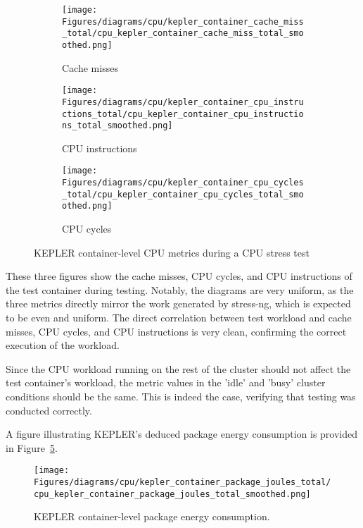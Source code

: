 \begin{figure}[H]
    \centering
    \begin{subfigure}{0.49\textwidth}
        \texttt{[image: Figures/diagrams/cpu/kepler\_container\_cache\_miss\_total/cpu\_kepler\_container\_cache\_miss\_total\_smoothed.png]}
        \caption{Cache misses}
        \label{fig:cpu_kepler_container_cache_miss_total}
    \end{subfigure}
    \begin{subfigure}{0.49\textwidth}
        \texttt{[image: Figures/diagrams/cpu/kepler\_container\_cpu\_instructions\_total/cpu\_kepler\_container\_cpu\_instructions\_total\_smoothed.png]}
        \caption{CPU instructions}
        \label{fig:cpu_kepler_container_cpu_instructions_total}
    \end{subfigure}
    \begin{subfigure}{1\textwidth}
        \texttt{[image: Figures/diagrams/cpu/kepler\_container\_cpu\_cycles\_total/cpu\_kepler\_container\_cpu\_cycles\_total\_smoothed.png]}
        \caption{CPU cycles}
        \label{fig:cpu_kepler_container_cpu_cycles_total}
    \end{subfigure}
    \caption[Container-Level CPU Metrics]{KEPLER container-level CPU metrics during a CPU stress test}
\end{figure}

These three figures show the cache misses, CPU cycles, and CPU instructions of the test container during testing. Notably, the diagrams are very uniform, as the three metrics directly mirror the work generated by stress-ng, which is expected to be even and uniform. The direct correlation between test workload and cache misses, CPU cycles, and CPU instructions is very clean, confirming the correct execution of the workload.

Since the CPU workload running on the rest of the cluster should not affect the test container’s workload, the metric values in the 'idle' and 'busy' cluster conditions should be the same. This is indeed the case, verifying that testing was conducted correctly.

A figure illustrating KEPLER's deduced package energy consumption is provided in Figure~\ref{fig:cpu_kepler_container_package_joules_total}.

\begin{figure}[H]
    \centering
    \texttt{[image: Figures/diagrams/cpu/kepler\_container\_package\_joules\_total/cpu\_kepler\_container\_package\_joules\_total\_smoothed.png]}
    \caption[Container Package energy]{KEPLER container-level package energy consumption.}
    \label{fig:cpu_kepler_container_package_joules_total}
\end{figure}

